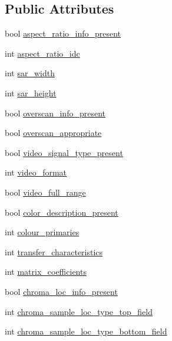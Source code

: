 \subsection*{Public Attributes}
\begin{DoxyCompactItemize}
\item 
bool \hyperlink{structvui__parameters_a71bd736f2550004929a5d27b1a63b836}{aspect\_\-ratio\_\-info\_\-present}
\item 
int \hyperlink{structvui__parameters_a9f8d3a76c12d36fdb97253002462c9f6}{aspect\_\-ratio\_\-idc}
\item 
int \hyperlink{structvui__parameters_a429d9b0afa11b99d4630c9a249af1e64}{sar\_\-width}
\item 
int \hyperlink{structvui__parameters_ae7387865a3dc31334a1f15066fee236b}{sar\_\-height}
\item 
bool \hyperlink{structvui__parameters_ab17cb5b29b6b0b668c9560a52f7d040c}{overscan\_\-info\_\-present}
\item 
bool \hyperlink{structvui__parameters_a3788b9e39d7ce695893ee76ae7eba919}{overscan\_\-appropriate}
\item 
bool \hyperlink{structvui__parameters_a9684753851e30c951d6383e285706611}{video\_\-signal\_\-type\_\-present}
\item 
int \hyperlink{structvui__parameters_aa1737b407d6ae404f5e81038b1ee9d65}{video\_\-format}
\item 
bool \hyperlink{structvui__parameters_aa9ac95d330a9bcd970830db2ac4bb0da}{video\_\-full\_\-range}
\item 
bool \hyperlink{structvui__parameters_a8f2f98b2f04a77b6a12e8dae4b471b45}{color\_\-description\_\-present}
\item 
int \hyperlink{structvui__parameters_ae030fe590b3066c38b9d7028977c674b}{colour\_\-primaries}
\item 
int \hyperlink{structvui__parameters_a79fffdb02b20cefeefe4b8f1a230c2b1}{transfer\_\-characteristics}
\item 
int \hyperlink{structvui__parameters_a8d57d2b0d069d8f17a15b3143fe798da}{matrix\_\-coefficients}
\item 
bool \hyperlink{structvui__parameters_a784d2f7efb44e8bbfc9f66c3a60c3375}{chroma\_\-loc\_\-info\_\-present}
\item 
int \hyperlink{structvui__parameters_a5c6836100475ed29b073070b86369bff}{chroma\_\-sample\_\-loc\_\-type\_\-top\_\-field}
\item 
int \hyperlink{structvui__parameters_aa0e924e4fbc7beb05de256e7f104cdbf}{chroma\_\-sample\_\-loc\_\-type\_\-bottom\_\-field}

\end{DoxyCompactItemize}
